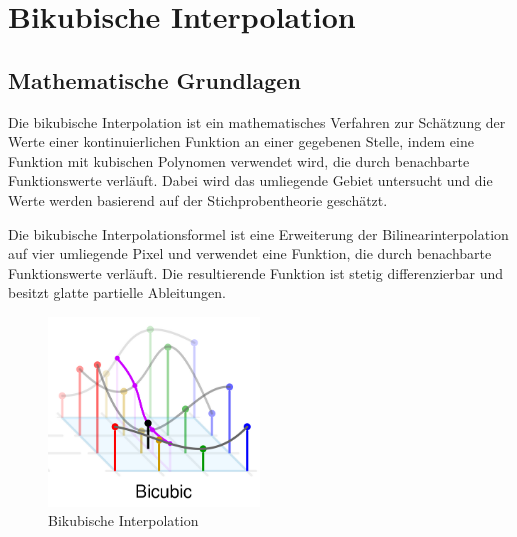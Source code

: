 \section{Bikubische Interpolation}

\subsection{Mathematische Grundlagen}


    
Die bikubische Interpolation ist ein mathematisches Verfahren zur Schätzung der Werte einer kontinuierlichen Funktion an einer gegebenen Stelle, indem eine Funktion mit kubischen Polynomen verwendet wird, die durch benachbarte Funktionswerte verläuft.
Dabei wird das umliegende Gebiet untersucht und die Werte werden basierend auf der Stichprobentheorie geschätzt.

Die bikubische Interpolationsformel ist eine Erweiterung der Bilinearinterpolation auf vier umliegende Pixel und verwendet eine Funktion, die durch benachbarte Funktionswerte verläuft.
Die resultierende Funktion ist stetig differenzierbar und besitzt glatte partielle Ableitungen.

\begin{figure}[h]
    \centering
    \includegraphics[width=0.5\textwidth]{img/bicubic_graph}
    \caption{Bikubische Interpolation}
    \label{fig:bicubic_interpolation}
\end{figure}

